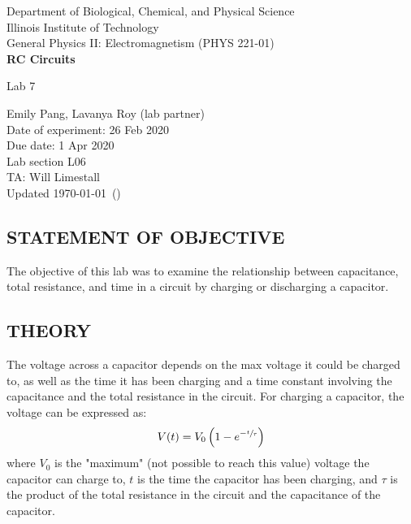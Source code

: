 \documentclass [12pt, letterpaper, twoside] {article}
\begin{document}
\begin {titlepage}
\begin {center}
Department of Biological, Chemical, and Physical Science\\
\vspace {0.1cm}
Illinois Institute of Technology\\
\vspace {0.1cm}
General Physics II: Electromagnetism (PHYS 221-01)\\
\vspace* {\fill}
\begingroup
\Large
\textbf {RC Circuits}
\vspace {0.35cm}

\normalsize
Lab 7 
\vspace {1.5cm}
\endgroup
\vspace* {\fill}
\end {center}

\vspace*{\fill}
\begin {flushright}
\footnotesize
Emily Pang, Lavanya Roy (lab partner) \\
Date of experiment: 26 Feb 2020 \\
Due date: 1 Apr 2020 \\
Lab section L06 \\
TA: Will Limestall \\
Updated \usdate\today~(\currenttime)
\end {flushright}
\end {titlepage}
\subsection* {STATEMENT OF OBJECTIVE}
The objective of this lab was to examine the relationship between capacitance, total resistance, and time in a circuit by charging or discharging a capacitor.

\subsection* {THEORY}
The voltage across a capacitor depends on the max voltage it could be charged to, as well as the time it has been charging and a time constant involving the capacitance and the total resistance in the circuit. For charging a capacitor, the voltage can be expressed as:
\begin{equation}
  \begin{split}
    V(t) &= V_{\text{0}}\left(1-e^{-\sfrac{t}{\tau}}\right) \\
  \end{split}
\end{equation}
where \(V_{\text{0}}\) is the "maximum" (not possible to reach this value) voltage the capacitor can charge to, \(t\) is the time the capacitor has been charging, and \(\tau\) is the product of the total resistance in the circuit and the capacitance of the capacitor.
\end{document}
